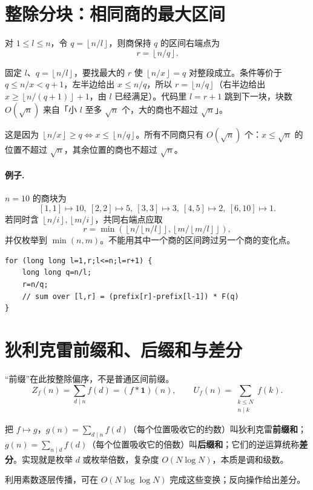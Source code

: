 \documentclass[UTF8,a4paper,11pt,oneside,openany,fontset=fandol]{ctexbook}
\theoremstyle{definition}
\newcommand{\one}{\mathbf 1}
\newcommand{\floor}[1]{\left\lfloor #1\right\rfloor}
\begin{document}
\section{整除分块：相同商的最大区间}
对 $1\le l\le n$，令 $q=\floor{n/l}$，则商保持 $q$ 的区间右端点为
\[
 r=\floor{n/q}.
\]

\begin{tip}[$r=\floor{n/q}$ 是怎么想到的]
固定 $l$、$q=\floor{n/l}$，要找最大的 $r$ 使 $\floor{n/x}=q$ 对整段成立。条件等价于 $q\le n/x<q+1$，左半边给出 $x\le n/q$，所以 $r=\floor{n/q}$（右半边给出 $x\ge\floor{n/(q+1)}+1$，由 $l$ 已经满足）。代码里 $l=r+1$ 跳到下一块，块数 $O(\sqrt n)$ 来自「小 $l$ 至多 $\sqrt n$ 个，大的商也不超过 $\sqrt n$」。
\end{tip}

这是因为 $\floor{n/x}\ge q\iff x\le\floor{n/q}$。所有不同商只有 $O(\sqrt n)$ 个：$x\le\sqrt n$ 的位置不超过 $\sqrt n$，其余位置的商也不超过 $\sqrt n$。

\paragraph{例子.} $n=10$ 的商块为
\[
[1,1]\mapsto10,\ [2,2]\mapsto5,\ [3,3]\mapsto3,\ [4,5]\mapsto2,\ [6,10]\mapsto1.
\]
若同时含 $\floor{n/i},\floor{m/i}$，共同右端点应取
\[
 r=\min\left(\floor{n/\floor{n/l}},\floor{m/\floor{m/l}}\right),
\]
并仅枚举到 $\min(n,m)$。不能用其中一个商的区间跨过另一个商的变化点。
\begin{lstlisting}
for (long long l=1,r;l<=n;l=r+1) {
    long long q=n/l;
    r=n/q;
    // sum over [l,r] = (prefix[r]-prefix[l-1]) * F(q)
}
\end{lstlisting}


\section{狄利克雷前缀和、后缀和与差分}
“前缀”在此按整除偏序，不是普通区间前缀。
\[
 Z_f(n)=\sum_{d\mid n}f(d)=(f*\one)(n),\qquad
 U_f(n)=\sum_{\substack{k\le N\\n\mid k}}f(k).
\]

\begin{tip}[这三个词在说什么]
把 $f\mapsto g$，$g(n)=\sum_{d\mid n}f(d)$（每个位置吸收它的约数）叫狄利克雷\textbf{前缀和}；$g(n)=\sum_{n\mid d}f(d)$（每个位置吸收它的倍数）叫\textbf{后缀和}；它们的逆运算统称\textbf{差分}。实现就是枚举 $d$ 或枚举倍数，复杂度 $O(N\log N)$，本质是调和级数。
\end{tip}

利用素数逐层传播，可在 $O(N\log\log N)$ 完成这些变换；反向操作给出差分。
\end{document}
